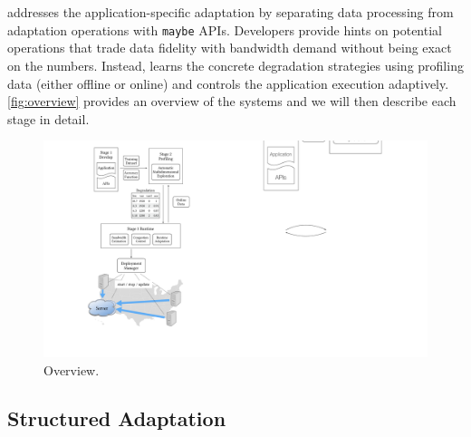 \section{\sysname{}}
\label{sec:system}

\sysname{} addresses the application-specific adaptation by separating data
processing from adaptation operations with \texttt{maybe} APIs. Developers
provide hints on potential operations that trade data fidelity with bandwidth
demand without being exact on the numbers. Instead, \sysname{} learns the
concrete degradation strategies using profiling data (either offline or online)
and controls the application execution adaptively. \autoref{fig:overview}
provides an overview of the systems and we will then describe each stage in
detail.

\begin{figure}
  \centering
  \includegraphics[width=.9\linewidth]{figures/system.pdf}
  \caption{\sysname{} Overview.}
  \label{fig:overview}
\end{figure}

\subsection{Structured Adaptation}
\label{sec:struct-adapt}

